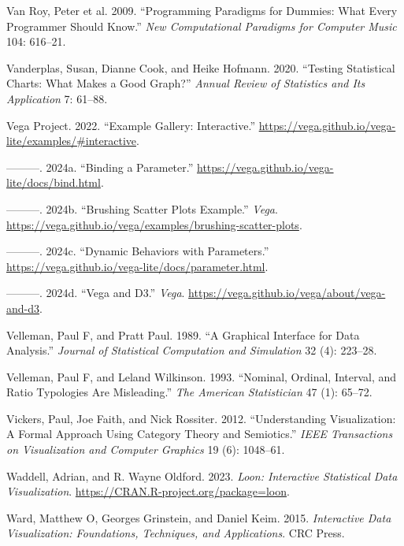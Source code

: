 \documentclass[
]{book}
\newlength{\cslhangindent}
\newenvironment{CSLReferences}[2] %
 {\begin{list}{}{%
  \setlength{\itemindent}{0pt}
  \setlength{\leftmargin}{0pt}
  \setlength{\parsep}{0pt}
  \ifodd #1
   \setlength{\leftmargin}{\cslhangindent}
   \setlength{\itemindent}{-1\cslhangindent}
  \fi
  \setlength{\itemsep}{#2\baselineskip}}}
 {\end{list}}
\theoremstyle{definition}
\theoremstyle{definition}
\theoremstyle{definition}
\theoremstyle{definition}
\theoremstyle{remark}
\begin{document}
\begin{CSLReferences}{1}{0}
Van Roy, Peter et al. 2009. {``Programming Paradigms for Dummies: What Every Programmer Should Know.''} \emph{New Computational Paradigms for Computer Music} 104: 616--21.

Vanderplas, Susan, Dianne Cook, and Heike Hofmann. 2020. {``Testing Statistical Charts: What Makes a Good Graph?''} \emph{Annual Review of Statistics and Its Application} 7: 61--88.

Vega Project. 2022. {``{Example Gallery: Interactive}.''} \url{https://vega.github.io/vega-lite/examples/\#interactive}.

---------. 2024a. {``{Binding a Parameter}.''} \url{https://vega.github.io/vega-lite/docs/bind.html}.

---------. 2024b. {``Brushing Scatter Plots Example.''} \emph{Vega}. \url{https://vega.github.io/vega/examples/brushing-scatter-plots}.

---------. 2024c. {``{Dynamic Behaviors with Parameters}.''} \url{https://vega.github.io/vega-lite/docs/parameter.html}.

---------. 2024d. {``Vega and D3.''} \emph{Vega}. \url{https://vega.github.io/vega/about/vega-and-d3}.

Velleman, Paul F, and Pratt Paul. 1989. {``A Graphical Interface for Data Analysis.''} \emph{Journal of Statistical Computation and Simulation} 32 (4): 223--28.

Velleman, Paul F, and Leland Wilkinson. 1993. {``Nominal, Ordinal, Interval, and Ratio Typologies Are Misleading.''} \emph{The American Statistician} 47 (1): 65--72.

Vickers, Paul, Joe Faith, and Nick Rossiter. 2012. {``Understanding Visualization: A Formal Approach Using Category Theory and Semiotics.''} \emph{IEEE Transactions on Visualization and Computer Graphics} 19 (6): 1048--61.

Waddell, Adrian, and R. Wayne Oldford. 2023. \emph{Loon: Interactive Statistical Data Visualization}. \url{https://CRAN.R-project.org/package=loon}.

Ward, Matthew O, Georges Grinstein, and Daniel Keim. 2015. \emph{Interactive Data Visualization: Foundations, Techniques, and Applications}. CRC Press.


\end{CSLReferences}
\end{document}
